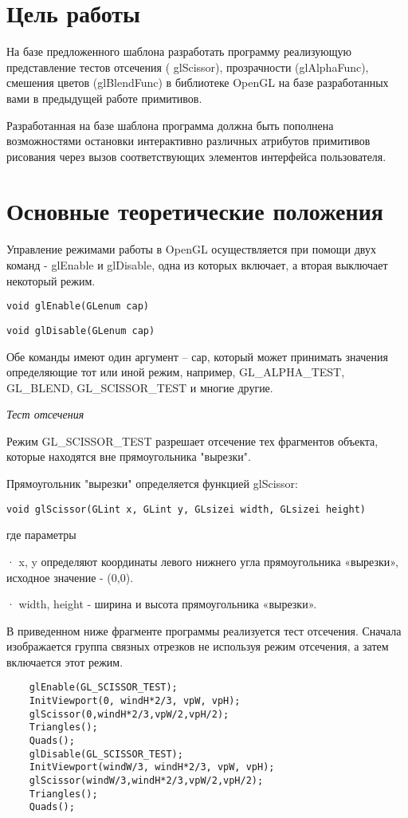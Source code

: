 \setcounter{page}{2}
\section*{Цель работы}
На базе предложенного шаблона разработать программу реализующую представление тестов отсечения ( glScissor), прозрачности (glAlphaFunc), смешения цветов (glBlendFunc) в библиотеке OpenGL на базе разработанных вами в предыдущей работе примитивов.

Разработанная на базе шаблона программа должна быть пополнена возможностями остановки интерактивно различных атрибутов примитивов рисования через вызов соответствующих элементов интерфейса пользователя.

\section*{Основные теоретические положения}
Управление режимами работы в OpenGL осуществляется при помощи двух команд - glEnable и glDisable, одна из которых включает, а вторая выключает некоторый режим.

\texttt{void glEnable(GLenum cap)}

\texttt{void glDisable(GLenum cap)}

Обе команды имеют один аргумент – сар, который может принимать значения определяющие тот или иной режим, например, GL\_ALPHA\_TEST, GL\_BLEND, GL\_SCISSOR\_TEST и многие другие.

\textit{Тест отсечения}

Режим GL\_SCISSOR\_TEST разрешает отсечение тех фрагментов объекта, которые находятся вне прямоугольника "вырезки".

Прямоугольник "вырезки" определяется функцией glScissor:

\texttt{void glScissor(GLint x, GLint y, GLsizei width, GLsizei height)}

где параметры

· x, y определяют координаты левого нижнего угла прямоугольника «вырезки», исходное значение - (0,0).

· width, height - ширина и высота прямоугольника «вырезки».

В приведенном ниже фрагменте программы реализуется тест отсечения.
Сначала изображается группа связных отрезков не используя режим отсечения, а затем включается этот режим.
\small
\begin{verbatim}
    glEnable(GL_SCISSOR_TEST);
    InitViewport(0, windH*2/3, vpW, vpH);
    glScissor(0,windH*2/3,vpW/2,vpH/2);
    Triangles();
    Quads();
    glDisable(GL_SCISSOR_TEST);
    InitViewport(windW/3, windH*2/3, vpW, vpH);
    glScissor(windW/3,windH*2/3,vpW/2,vpH/2);
    Triangles();
    Quads();
\end{verbatim}
\normalsize

